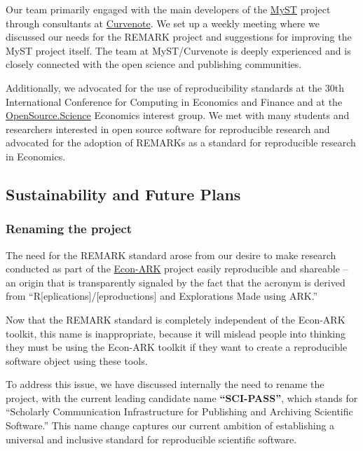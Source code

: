 \documentclass{article}
\begin{document}
Our team primarily engaged with the main developers of the \href{https://github.com/jupyter-book/mystmd}{MyST} project through consultants at \href{https://curvenote.com/}{Curvenote}. We set up a weekly meeting where we discussed our needs for the REMARK project and suggestions for improving the MyST project itself. The team at MyST/Curvenote is deeply experienced and is closely connected with the open science and publishing communities.

Additionally, we advocated for the use of reproducibility standards at the 30th International Conference for Computing in Economics and Finance and at the \href{https://opensource.science/}{OpenSource.Science} Economics interest group. We met with many students and researchers interested in open source software for reproducible research and advocated for the adoption of REMARKs as a standard for reproducible research in Economics.

\subsection{Sustainability and Future Plans}


\subsubsection{Renaming the project}

The need for the REMARK standard arose from our desire to make research conducted as part of the \href{https://econ-ark.org}{Econ-ARK} project easily reproducible and shareable -- an origin that is transparently signaled by the fact that the acronym is derived from ``R[eplications]/[eproductions] and Explorations Made using ARK.''

Now that the REMARK standard is completely independent of the Econ-ARK toolkit, this name is inappropriate, because it will mislead people into thinking they must be using the Econ-ARK toolkit if they want to create a reproducible software object using these tools.

To address this issue, we have discussed internally the need to rename the project, with the current leading candidate name \textbf{``SCI-PASS''}, which stands for ``Scholarly Communication Infrastructure for Publishing and Archiving Scientific Software.'' This name change captures our current ambition of establishing a universal and inclusive standard for reproducible scientific software.
\end{document}
